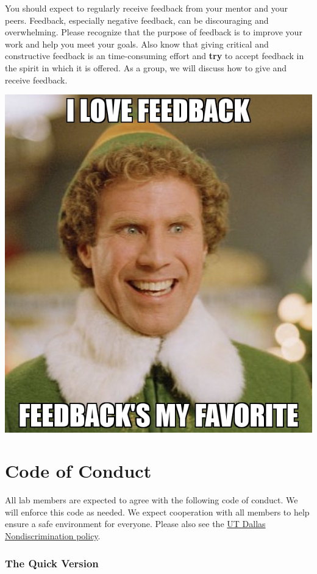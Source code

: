 \documentclass[]{book}
\begin{document}
You should expect to regularly receive feedback from your mentor and your peers. Feedback, especially negative feedback, can be discouraging and overwhelming. Please recognize that the purpose of feedback is to improve your work and help you meet your goals. Also know that giving critical and constructive feedback is an time-consuming effort and \textbf{try} to accept feedback in the spirit in which it is offered. As a group, we will discuss how to give and receive feedback.

\includegraphics{images/i-love-feedback.jpg}

\hypertarget{code-of-conduct}{%
\chapter{Code of Conduct}\label{code-of-conduct}}

All lab members are expected to agree with the following code of conduct. We will enforce this code as needed. We expect cooperation with all members to help ensure a safe environment for everyone. Please also see the \href{https://policy.utdallas.edu/utdbp3090}{UT Dallas Nondiscrimination policy}.

\hypertarget{the-quick-version}{%
\subsection{The Quick Version}\label{the-quick-version}}
\end{document}

